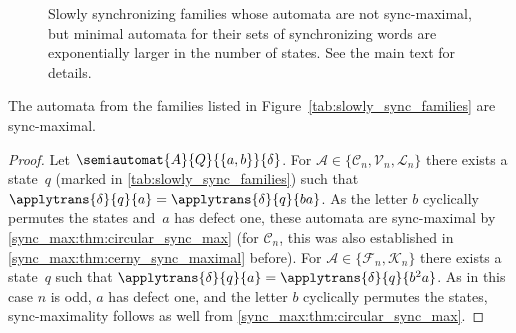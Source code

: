 \begin{figure}[th]
\begin{minipage}[b]{.45\textwidth}
{{} 
		}
	\end{minipage}
\caption[Non-sync-maximal and slowly synchronizing automata families]{Slowly synchronizing families
	whose automata are not sync-maximal, but minimal automata for their sets of synchronizing
	words are exponentially larger in the number of states.
	 See the main text for details. %
} \label{def:overlineAn} \label{def:Mn} \label{def:Bn}
\label{fig:slowly}
\end{figure}

\begin{theorem}
\label{sync_max:thm:families}
	The automata from the families listed in Figure~\ref{tab:slowly_sync_families} are sync-maximal.
\end{theorem}
\begin{proof}
	Let $\semiautomat{A}{Q}{\{a,b\}}{\delta}$.
	For $\mathcal A \in \{\mathcal C_n, \mathcal V_n, \mathcal L_n \}$
	there exists a state~$q$ (marked in \cref{tab:slowly_sync_families})
	such that $\applytrans{\delta}{q}{a} = \applytrans{\delta}{q}{ba}$.
	As the letter $b$ cyclically permutes the states and~$a$ has defect one,
	these automata are sync-maximal by \cref{sync_max:thm:circular_sync_max} 
	(for $\mathcal C_n$, this was also established in \cref{sync_max:thm:cerny_sync_maximal} before).	
	For $\mathcal A \in \{\mathcal F_n, \mathcal K_n\}$ there exists a state~$q$
	such that $\applytrans{\delta}{q}{a} = \applytrans{\delta}{q}{b^2a}$.
	As in this case $n$ is odd, $a$ has defect one, and the letter $b$ cyclically permutes the states,
	sync-maximality follows as well from \cref{sync_max:thm:circular_sync_max}.
\end{proof}

